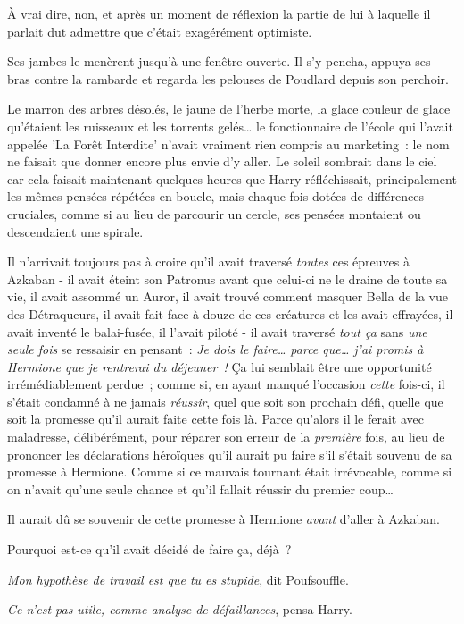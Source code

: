 À vrai dire, non, et après un moment de réflexion la partie de lui à laquelle il parlait dut admettre que c'était exagérément optimiste.

Ses jambes le menèrent jusqu'à une fenêtre ouverte. Il s'y pencha, appuya ses bras contre la rambarde et regarda les pelouses de Poudlard depuis son perchoir.

Le marron des arbres désolés, le jaune de l'herbe morte, la glace couleur de glace qu'étaient les ruisseaux et les torrents gelés… le fonctionnaire de l'école qui l'avait appelée 'La Forêt Interdite' n'avait vraiment rien compris au marketing~: le nom ne faisait que donner encore plus envie d'y aller. Le soleil sombrait dans le ciel car cela faisait maintenant quelques heures que Harry réfléchissait, principalement les mêmes pensées répétées en boucle, mais chaque fois dotées de différences cruciales, comme si au lieu de parcourir un cercle, ses pensées montaient ou descendaient une spirale.

Il n'arrivait toujours pas à croire qu'il avait traversé \emph{toutes} ces épreuves à Azkaban - il avait éteint son Patronus avant que celui-ci ne le draine de toute sa vie, il avait assommé un Auror, il avait trouvé comment masquer Bella de la vue des Détraqueurs, il avait fait face à douze de ces créatures et les avait effrayées, il avait inventé le balai-fusée, il l'avait piloté - il avait traversé \emph{tout ça} sans \emph{une seule fois} se ressaisir en pensant~: \emph{Je dois le faire… parce que… j'ai promis à Hermione que je rentrerai du déjeuner~!} Ça lui semblait être une opportunité irrémédiablement perdue~; comme si, en ayant manqué l'occasion \emph{cette} fois-ci, il s'était condamné à ne jamais \emph{réussir}, quel que soit son prochain défi, quelle que soit la promesse qu'il aurait faite cette fois là. Parce qu'alors il le ferait avec maladresse, délibérément, pour réparer son erreur de la \emph{première} fois, au lieu de prononcer les déclarations héroïques qu'il aurait pu faire s'il s'était souvenu de sa promesse à Hermione. Comme si ce mauvais tournant était irrévocable, comme si on n'avait qu'une seule chance et qu'il fallait réussir du premier coup…

Il aurait dû se souvenir de cette promesse à Hermione \emph{avant} d'aller à Azkaban.

Pourquoi est-ce qu'il avait décidé de faire ça, déjà~?

\emph{Mon hypothèse de travail est que tu es stupide}, dit Poufsouffle.

\emph{Ce n'est pas utile, comme analyse de défaillances}, pensa Harry.

